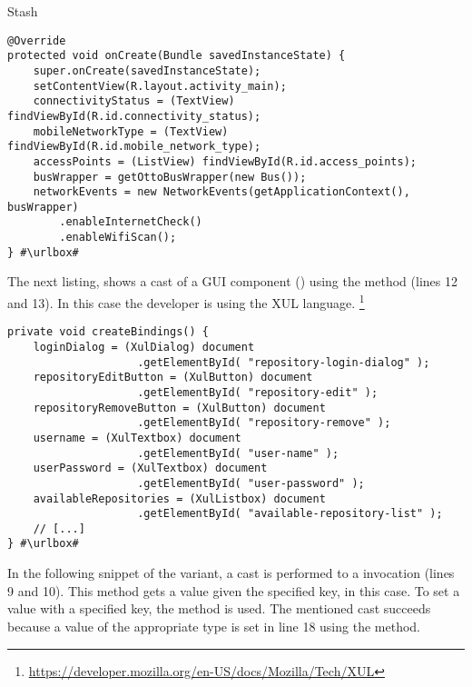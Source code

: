 \begin{pattern}{Stash}
\def\urlvar{http://bit.ly/pwittchen_NetworkEvents_2HGbrMq}
\begin{verbatim}
@Override
protected void onCreate(Bundle savedInstanceState) {
    super.onCreate(savedInstanceState);
    setContentView(R.layout.activity_main);
    connectivityStatus = (TextView) findViewById(R.id.connectivity_status);
    mobileNetworkType = (TextView) findViewById(R.id.mobile_network_type);
    accessPoints = (ListView) findViewById(R.id.access_points);
    busWrapper = getOttoBusWrapper(new Bus());
    networkEvents = new NetworkEvents(getApplicationContext(), busWrapper)
        .enableInternetCheck()
        .enableWifiScan();
} #\urlbox#
\end{verbatim}

The next listing,
shows a cast of a GUI component () using the  method (lines 12 and 13).
In this case the developer is using the XUL language.%
\footnote{\url{https://developer.mozilla.org/en-US/docs/Mozilla/Tech/XUL}}

\def\urlvar{http://bit.ly/pentaho_pentaho_kettle_2TswNSf}
\begin{verbatim}
private void createBindings() {
    loginDialog = (XulDialog) document
                    .getElementById( "repository-login-dialog" );
    repositoryEditButton = (XulButton) document
                    .getElementById( "repository-edit" );
    repositoryRemoveButton = (XulButton) document
                    .getElementById( "repository-remove" );
    username = (XulTextbox) document
                    .getElementById( "user-name" );
    userPassword = (XulTextbox) document
                    .getElementById( "user-password" );
    availableRepositories = (XulListbox) document
                    .getElementById( "available-repository-list" );
    // [...]
} #\urlbox#
\end{verbatim}

In the following snippet of the  variant,
a cast is performed to a  invocation (lines 9 and 10).
This method gets a  value given the specified key,  in this case.
To set a value with a specified key, the  method is used.
The mentioned cast succeeds because a value of the appropriate type is set in line 18 using the  method.


\end{pattern}
